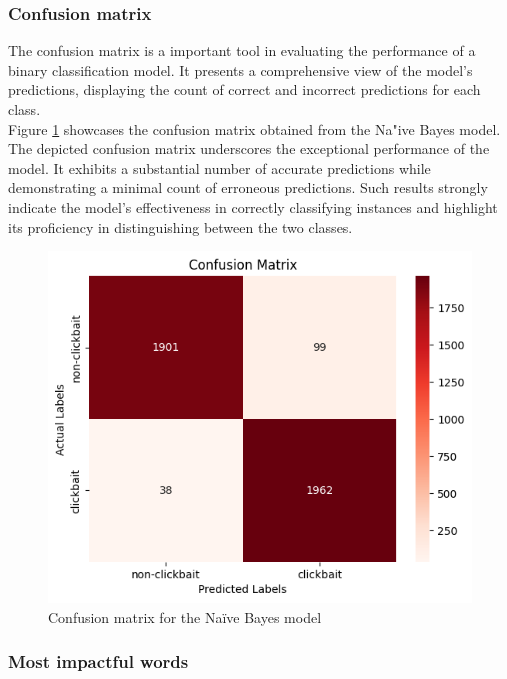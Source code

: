\documentclass{class}
\begin{document}
\subsubsection*{Confusion matrix}
The confusion matrix is a important tool in evaluating the performance of a binary classification model.
It presents a comprehensive view of the model's predictions, displaying the count of correct and incorrect predictions for each class.\\
Figure \ref{fig-12} showcases the confusion matrix obtained from the Na"ive Bayes model.
The depicted confusion matrix underscores the exceptional performance of the model.
It exhibits a substantial number of accurate predictions while demonstrating a minimal count of erroneous predictions.
Such results strongly indicate the model's effectiveness in correctly classifying instances and highlight its proficiency
in distinguishing between the two classes.
\begin{figure}[h]
    \centering
    \includegraphics[width=0.5\columnwidth]{images/naive_conf_matrix.png}
    \caption{Confusion matrix for the Na\"ive Bayes model}
    \label{fig-12}
\end{figure}
\subsubsection*{Most impactful words}
\end{document}
